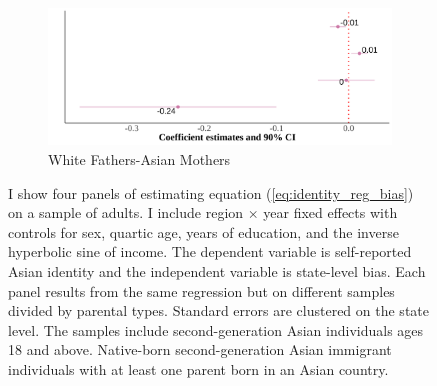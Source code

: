 \begin{center}
\begin{figure}[!htb]
\begin{subfigure}{.48\textwidth}
\caption{White Fathers-Asian Mothers}
\centering
\includegraphics[width=.9\linewidth]{by-parents-regs-wh-adults.png}
\end{subfigure}
\caption*{\footnotesize{I show four panels of estimating equation (\ref{eq:identity_reg_bias}) on a sample of adults. I include region $\times$ year fixed effects with controls for sex, quartic age, years of education, and the inverse hyperbolic sine of income. The dependent variable is self-reported Asian identity and the independent variable is state-level bias. Each panel results from the same regression but on different samples divided by parental types. Standard errors are clustered on the state level. The samples include second-generation Asian individuals ages 18 and above. Native-born second-generation Asian immigrant individuals with at least one parent born in an Asian country.}}
\end{figure}
\end{center}

\pagebreak
\newpage


